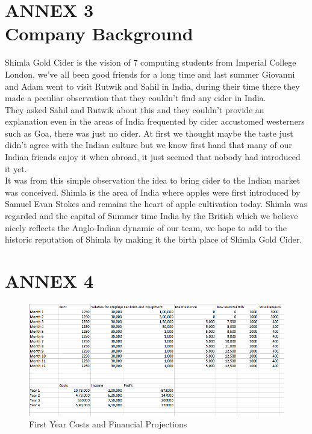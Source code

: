 \documentclass[11pt]{article}
\begin{document}
\newpage

\section{ANNEX 3 \\ Company Background}
Shimla Gold Cider is the vision of 7 computing students from Imperial College London, we've all been good friends for a long time and last summer Giovanni and Adam went to visit Rutwik and Sahil in India, during their time there they made a peculiar observation that they couldn't find any cider in India. \\

\noindent They asked Sahil and Rutwik about this and they couldn't provide an explanation even in the areas of India frequented by cider accustomed westerners such as Goa, there was just no cider. At first we thought maybe the taste just didn't agree with the Indian culture but we know first hand that many of our Indian friends enjoy it when abroad, it just seemed that nobody had introduced it yet. \\

\noindent It was from this simple observation the idea to bring cider to the Indian market was conceived. Shimla is the area of India where apples were first introduced by Samuel Evan Stokes and remains the heart of apple cultivation today. Shimla was regarded and the capital of Summer time India by the British which we believe nicely reflects the Anglo-Indian dynamic of our team, we hope to add to the historic reputation of Shimla by making it the birth place of Shimla Gold Cider.

\newpage
\section{ANNEX 4}

\begin{figure}[h!]
	\caption{First Year Costs and Financial Projections}
	\centering
	\includegraphics[width=\textwidth]{costs.png}
	\end{figure}
\newpage
\end{document}
